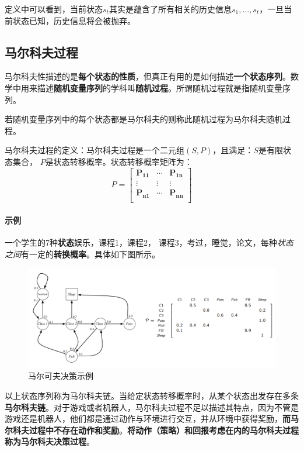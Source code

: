 \documentclass[UTF8,a4paper,12pt]{ctexbook}
\begin{document}
			定义中可以看到，当前状态$s_t$其实是蕴含了所有相关的历史信息$s_1,...,s_t$，一旦当前状态已知，历史信息将会被抛弃。
			
		\subsection{马尔科夫过程}
			马尔科夫性描述的是\textbf{每个状态的性质}，但真正有用的是如何描述\textbf{一个状态序列}。数学中用来描述\textbf{随机变量序列}的学科叫\textbf{随机过程}。所谓随机过程就是指随机变量序列。
			
			若随机变量序列中的每个状态都是马尔科夫的则称此随机过程为马尔科夫随机过程。
			
			马尔科夫过程的定义：马尔科夫过程是一个二元组$(S,P)$，且满足：$S$是有限状态集合， $P$是状态转移概率。状态转移概率矩阵为：
			$$
				P = \left[
							\begin{array}{ccc}
								\mathbf{P_{11}} & \cdots & \mathbf{P_{1n}}\\
								
								\vdots & \vdots & \vdots\\
								
								\mathbf{P_{n1}} & \cdots & \mathbf{P_{nn}}\\
							\end{array}
					\right]
			$$
			
			\paragraph{示例}
				一个学生的7种\textbf{状态}{娱乐，课程1，课程2， 课程3，考过，睡觉，论文}，每种\textit{状态之间}有一定的\textbf{转换概率}。具体如下图所示。
				
				\begin{figure}[H]
					\centering
					\includegraphics[width=.9\linewidth]{MDP-example}
					\caption{马尔可夫决策示例}
				\end{figure}
				
				以上状态序列称为马尔科夫链。当给定状态转移概率时，从某个状态出发存在多条\textbf{马尔科夫链}。对于游戏或者机器人，马尔科夫过程不足以描述其特点，因为不管是游戏还是机器人，他们都是通过动作与环境进行交互，并从环境中获得奖励，\textbf{而马尔科夫过程中不存在动作和奖励}。\textbf{将动作（策略）和回报考虑在内的马尔科夫过程称为马尔科夫决策过程}。
				
\end{document}
